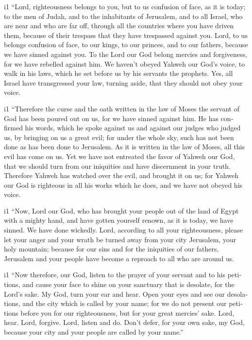 \begin{paracol}{2}
\begin{otherlanguage}{english}
i1  ``Lord, righteousness belongs to you, but to us
confusion of face, as it is today; to the men of Judah, and to the
inhabitants of Jerusalem, and to all Israel, who are near and who are
far off, through all the countries where you have driven them, because
of their trespass that they have trespassed against you. 
Lord, to us belongs confusion of face, to our kings, to our princes, and
to our fathers, because we have sinned against you.  To
the Lord our God belong mercies and forgiveness, for we have rebelled
against him.  We haven't obeyed Yahweh our God's voice,
to walk in his laws, which he set before us by his servants the
prophets.  Yes, all Israel have transgressed your law,
turning aside, that they should not obey your voice.

i1 ``Therefore the curse and the oath written in the law of Moses the
servant of God has been poured out on us, for we have sinned against
him.  He has confirmed his words, which he spoke against
us and against our judges who judged us, by bringing on us a great evil;
for under the whole sky, such has not been done as has been done to
Jerusalem.  As it is written in the law of Moses, all
this evil has come on us. Yet we have not entreated the favor of Yahweh
our God, that we should turn from our iniquities and have discernment in
your truth.  Therefore Yahweh has watched over the evil,
and brought it on us; for Yahweh our God is righteous in all his works
which he does, and we have not obeyed his voice.

i1  ``Now, Lord our God, who has brought your people out
of the land of Egypt with a mighty hand, and have gotten yourself
renown, as it is today, we have sinned. We have done wickedly.
 Lord, according to all your righteousness, please let
your anger and your wrath be turned away from your city Jerusalem, your
holy mountain; because for our sins and for the iniquities of our
fathers, Jerusalem and your people have become a reproach to all who are
around us.

i1  ``Now therefore, our God, listen to the prayer of
your servant and to his petitions, and cause your face to shine on your
sanctuary that is desolate, for the Lord's sake.  My God,
turn your ear and hear. Open your eyes and see our desolations, and the
city which is called by your name; for we do not present our petitions
before you for our righteousness, but for your great mercies' sake.
 Lord, hear. Lord, forgive. Lord, listen and do. Don't
defer, for your own sake, my God, because your city and your people are
called by your name.''


\end{otherlanguage}
\end{paracol}
